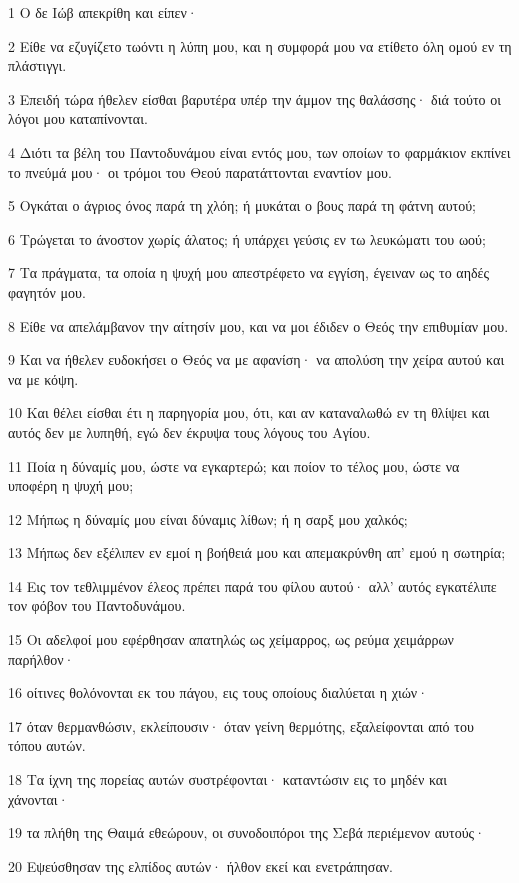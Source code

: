 \par 1 Ο δε Ιώβ απεκρίθη και είπεν·
\par 2 Είθε να εζυγίζετο τωόντι η λύπη μου, και η συμφορά μου να ετίθετο όλη ομού εν τη πλάστιγγι.
\par 3 Επειδή τώρα ήθελεν είσθαι βαρυτέρα υπέρ την άμμον της θαλάσσης· διά τούτο οι λόγοι μου καταπίνονται.
\par 4 Διότι τα βέλη του Παντοδυνάμου είναι εντός μου, των οποίων το φαρμάκιον εκπίνει το πνεύμά μου· οι τρόμοι του Θεού παρατάττονται εναντίον μου.
\par 5 Ογκάται ο άγριος όνος παρά τη χλόη; ή μυκάται ο βους παρά τη φάτνη αυτού;
\par 6 Τρώγεται το άνοστον χωρίς άλατος; ή υπάρχει γεύσις εν τω λευκώματι του ωού;
\par 7 Τα πράγματα, τα οποία η ψυχή μου απεστρέφετο να εγγίση, έγειναν ως το αηδές φαγητόν μου.
\par 8 Είθε να απελάμβανον την αίτησίν μου, και να μοι έδιδεν ο Θεός την επιθυμίαν μου.
\par 9 Και να ήθελεν ευδοκήσει ο Θεός να με αφανίση· να απολύση την χείρα αυτού και να με κόψη.
\par 10 Και θέλει είσθαι έτι η παρηγορία μου, ότι, και αν καταναλωθώ εν τη θλίψει και αυτός δεν με λυπηθή, εγώ δεν έκρυψα τους λόγους του Αγίου.
\par 11 Ποία η δύναμίς μου, ώστε να εγκαρτερώ; και ποίον το τέλος μου, ώστε να υποφέρη η ψυχή μου;
\par 12 Μήπως η δύναμίς μου είναι δύναμις λίθων; ή η σαρξ μου χαλκός;
\par 13 Μήπως δεν εξέλιπεν εν εμοί η βοήθειά μου και απεμακρύνθη απ' εμού η σωτηρία;
\par 14 Εις τον τεθλιμμένον έλεος πρέπει παρά του φίλου αυτού· αλλ' αυτός εγκατέλιπε τον φόβον του Παντοδυνάμου.
\par 15 Οι αδελφοί μου εφέρθησαν απατηλώς ως χείμαρρος, ως ρεύμα χειμάρρων παρήλθον·
\par 16 οίτινες θολόνονται εκ του πάγου, εις τους οποίους διαλύεται η χιών·
\par 17 όταν θερμανθώσιν, εκλείπουσιν· όταν γείνη θερμότης, εξαλείφονται από του τόπου αυτών.
\par 18 Τα ίχνη της πορείας αυτών συστρέφονται· καταντώσιν εις το μηδέν και χάνονται·
\par 19 τα πλήθη της Θαιμά εθεώρουν, οι συνοδοιπόροι της Σεβά περιέμενον αυτούς·
\par 20 Εψεύσθησαν της ελπίδος αυτών· ήλθον εκεί και ενετράπησαν.
